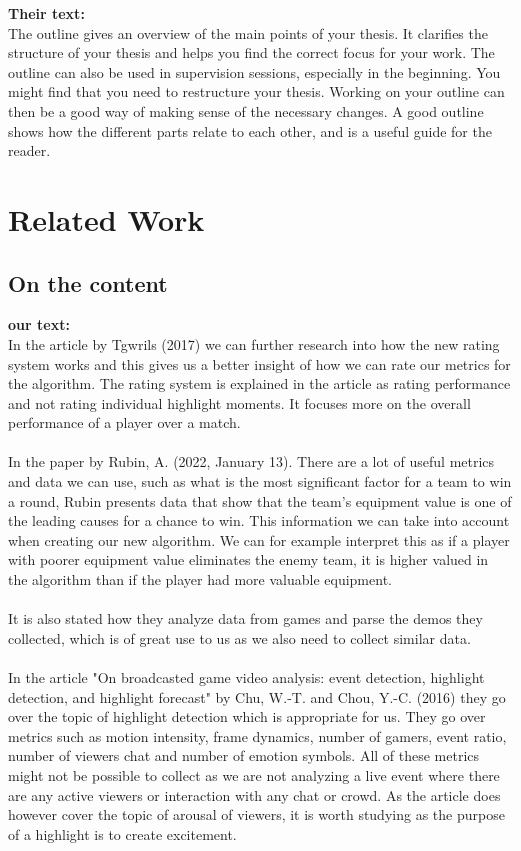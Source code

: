 \documentclass[a4paper,twoside]{bth}
\begin{document}
\textbf{Their text:}\\
The outline gives an overview of the main points of your thesis. It clarifies the structure of your thesis and helps you find the correct focus for your work. The outline can also be used in supervision sessions, especially in the beginning. You might find that you need to restructure your thesis. Working on your outline can then be a good way of making sense of the necessary changes. A good outline shows how the different parts relate to each other, and is a useful guide for the reader.


\chapter{Related Work}
\label{chp:relatedwork}
\section{On the content}
\textbf{our text:}\\
In the article \cite{Tgwri1s2017} by Tgwrils (2017) we can further research into how the new rating system works and this gives us a better insight of how we can rate our metrics for the algorithm. The rating system is explained in the article as rating performance and not rating individual highlight moments. It focuses more on the overall performance of a player over a match. 
\\\\
In the paper \cite{Rubin2022} by Rubin, A. (2022, January 13). There are a lot of useful metrics and data we can use, such as what is the most significant factor for a team to win a round, Rubin presents data that show that the team's equipment value is one of the leading causes for a chance to win. This information we can take into account when creating our new algorithm. We can for example interpret this as if a player with poorer equipment value eliminates the enemy team, it is higher valued in the algorithm than if the player had more valuable equipment.\\\\ 
It is also stated how they analyze data from games and parse the demos they collected, which is of great use to us as we also need to collect similar data.\\\\
In the article "On broadcasted game video analysis: event detection, highlight detection, and highlight forecast" by Chu, W.-T. and Chou, Y.-C. (2016) they go over the topic of highlight detection which is appropriate for us. They go over metrics such as motion intensity, frame dynamics, number of gamers, event ratio, number of viewers chat and number of emotion symbols. All of these metrics might not be possible to collect as we are not analyzing a live event where there are any active viewers or interaction with any chat or crowd. As the article does however cover the topic of arousal of viewers, it is worth studying as the purpose of a highlight is to create excitement.\\\\
\end{document}
